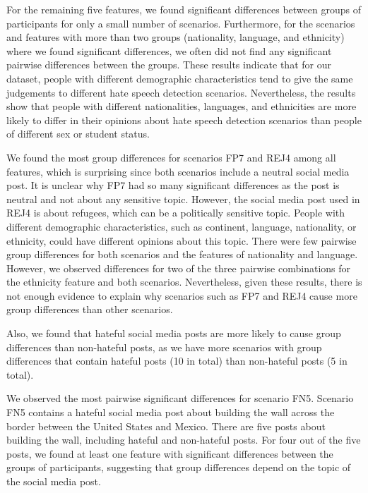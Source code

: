 %
For the remaining five features, we found significant differences between groups of participants for only a small number of scenarios.
%
Furthermore, for the scenarios and features with more than two groups (nationality, language, and ethnicity) where we found significant differences, we often did not find any significant pairwise differences between the groups.
%
These results indicate that for our dataset, people with different demographic characteristics tend to give the same judgements to different hate speech detection scenarios.
%
Nevertheless, the results show that people with different nationalities, languages, and ethnicities are more likely to differ in their opinions about hate speech detection scenarios than people of different sex or student status.
%


%
We found the most group differences for scenarios FP7 and REJ4 among all features, which is surprising since both scenarios include a neutral social media post.
%
It is unclear why FP7 had so many significant differences as the post is neutral and not about any sensitive topic.
%
However, the social media post used in REJ4 is about refugees, which can be a politically sensitive topic.
%
People with different demographic characteristics, such as continent, language, nationality, or ethnicity, could have different opinions about this topic.
%
There were few pairwise group differences for both scenarios and the features of nationality and language.
%
However, we observed differences for two of the three pairwise combinations for the ethnicity feature and both scenarios.
%
Nevertheless, given these results, there is not enough evidence to explain why scenarios such as FP7 and REJ4 cause more group differences than other scenarios.
%

%
Also, we found that hateful social media posts are more likely to cause group differences than non-hateful posts, as we have more scenarios with group differences that contain hateful posts (10 in total) than non-hateful posts (5 in total).
%

%
We observed the most pairwise significant differences for scenario FN5.
%
Scenario FN5 contains a hateful social media post about building the wall across the border between the United States and Mexico.
%
There are five posts about building the wall, including hateful and non-hateful posts.
%
For four out of the five posts, we found at least one feature with significant differences between the groups of participants, suggesting that group differences depend on the topic of the social media post.
%


